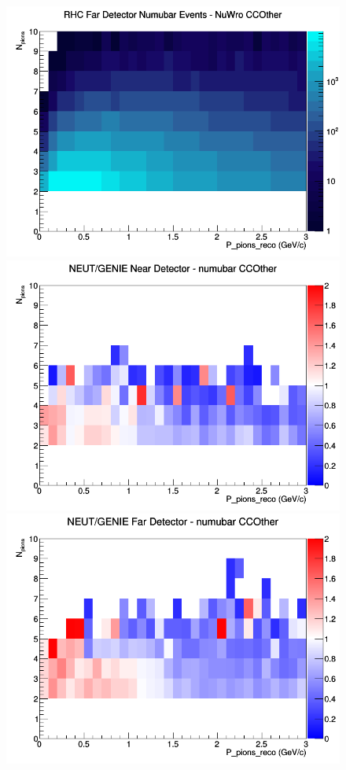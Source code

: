 \documentclass[12pt]{article}
\begin{document}
\begin{figure}[h]
\endminipage
{}
\includegraphics[width=\linewidth]{eff_N_P/LAr/pions/CCOther_RHC_FD_numubar_N_P_NuWro.png}
\endminipage
\newline
{}
\includegraphics[width=\linewidth]{eff_N_P/LAr/pions/ratios/CCOther_NEUT_GENIE_numubar_near_N_P.png}
\endminipage
{}
\includegraphics[width=\linewidth]{eff_N_P/LAr/pions/ratios/CCOther_NEUT_GENIE_numubar_far_N_P.png}

\end{figure}
\end{document}
